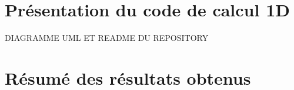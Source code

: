 

















\section{Présentation du code de calcul 1D}
DIAGRAMME UML ET README DU REPOSITORY









\section{Résumé des résultats obtenus}

















